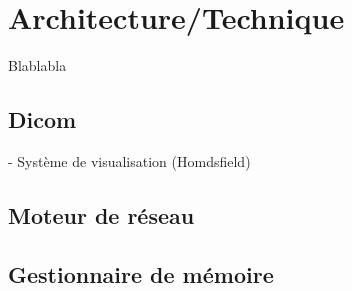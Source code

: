 \chapter{Architecture/Technique}

Blablabla

\section{Dicom}

- Système de visualisation (Homdsfield)

\section{Moteur de réseau}

\section{Gestionnaire de mémoire}
